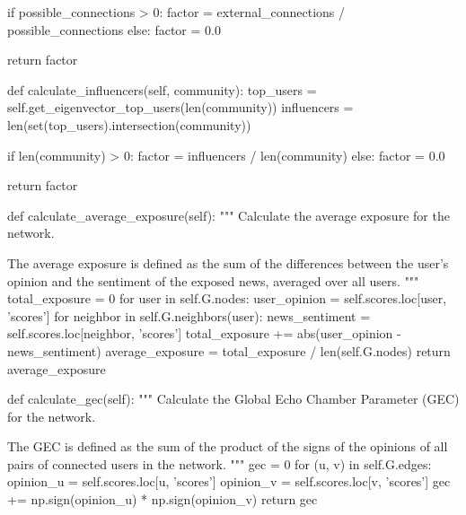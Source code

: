 \begin{codigo}[caption={Exemplo de classe Python para deteção de câmaras de eco}, label={codigo:echochamberdetector}, language=Python, breaklines=true]
      if possible_connections > 0:
          factor = external_connections / possible_connections
      else:
          factor = 0.0

      return factor

    def calculate_influencers(self, community):
      top_users = self.get_eigenvector_top_users(len(community))
      influencers = len(set(top_users).intersection(community))

      if len(community) > 0:
          factor = influencers / len(community)
      else:
          factor = 0.0

      return factor

    def calculate_average_exposure(self):
        """
        Calculate the average exposure for the network.

        The average exposure is defined as the sum of the differences between the user's opinion and the sentiment of the exposed news, averaged over all users.
        """
        total_exposure = 0
        for user in self.G.nodes:
            user_opinion = self.scores.loc[user, 'scores']
            for neighbor in self.G.neighbors(user):
                news_sentiment = self.scores.loc[neighbor, 'scores']
                total_exposure += abs(user_opinion - news_sentiment)
        average_exposure = total_exposure / len(self.G.nodes)
        return average_exposure
    
    def calculate_gec(self):
        """
        Calculate the Global Echo Chamber Parameter (GEC) for the network.

        The GEC is defined as the sum of the product of the signs of the opinions of all pairs of connected users in the network.
        """
        gec = 0
        for (u, v) in self.G.edges:
            opinion_u = self.scores.loc[u, 'scores']
            opinion_v = self.scores.loc[v, 'scores']
            gec += np.sign(opinion_u) * np.sign(opinion_v)
        return gec  
\end{codigo}